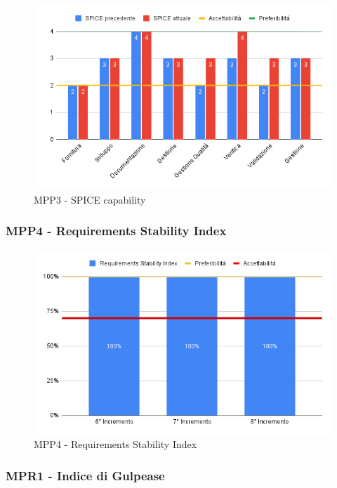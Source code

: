 \begin{figure}[H]
	\centering
	\includegraphics[scale = 0.6]{sezioni/Images/CA/SPICE.png}
	\caption{MPP3 - SPICE capability}
\end{figure}

\subsubsection{MPP4 - Requirements Stability Index}

\begin{figure}[H]
	\centering
	\includegraphics[scale = 0.6]{sezioni/Images/CA/RSI.png}
	\caption{MPP4 - Requirements Stability Index}
\end{figure}

\subsubsection{MPR1 - Indice di Gulpease}

